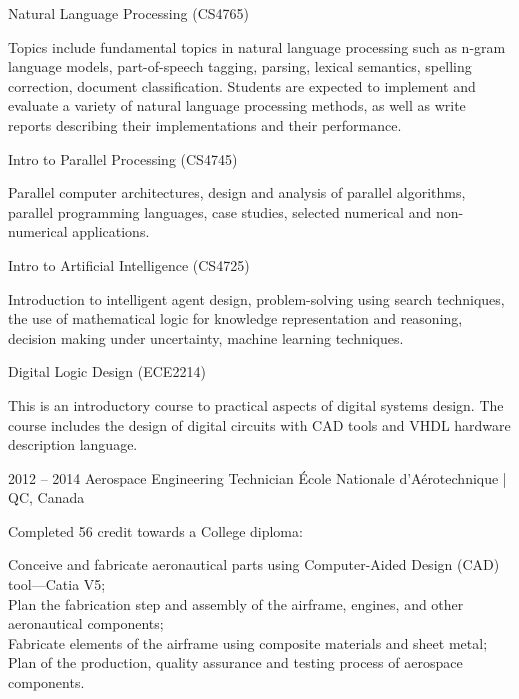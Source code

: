 \documentclass{developercv} %
\begin{document}
\begin{entrylist}
{		\textbullet{} Natural Language Processing (CS4765)
		\begin{smallQuote}
			Topics include fundamental topics in natural language processing such as n-gram language models, part-of-speech tagging, parsing, lexical semantics, spelling correction, document classification.
			Students are expected to implement and evaluate a variety of natural language processing methods, as well as write reports describing their implementations and their performance.
		\end{smallQuote}

		\textbullet{} Intro to Parallel Processing (CS4745)
		\begin{smallQuote}
			Parallel computer architectures, design and analysis of parallel algorithms, parallel programming languages, case studies, selected numerical and non-numerical applications.
		\end{smallQuote}

		\textbullet{} Intro to Artificial Intelligence (CS4725)
		\begin{smallQuote}
			Introduction to intelligent agent design, problem-solving using search techniques, the use of mathematical logic for knowledge representation and reasoning, decision making under uncertainty, machine learning techniques.
		\end{smallQuote}

		\textbullet{} Digital Logic Design (ECE2214)
		\begin{smallQuote}
			This is an introductory course to practical aspects of digital systems design. The course includes the design of digital circuits with CAD tools and VHDL hardware description language.
		\end{smallQuote}
	}

	\entry
	{2012 -- 2014}
	{Aerospace Engineering Technician}
	{École Nationale d'Aérotechnique | QC, Canada}
	{Completed 56 credit towards a College diploma:
		\begin{smallQuote}
			Conceive and fabricate aeronautical parts using Computer-Aided Design (CAD) tool---Catia V5;\\
			Plan the fabrication step and assembly of the airframe, engines, and other aeronautical components;\\
			Fabricate elements of the airframe using composite materials and sheet metal;\\
			Plan of the production, quality assurance and testing process of aerospace components.
		\end{smallQuote}
	}

\end{entrylist}
\end{document}
